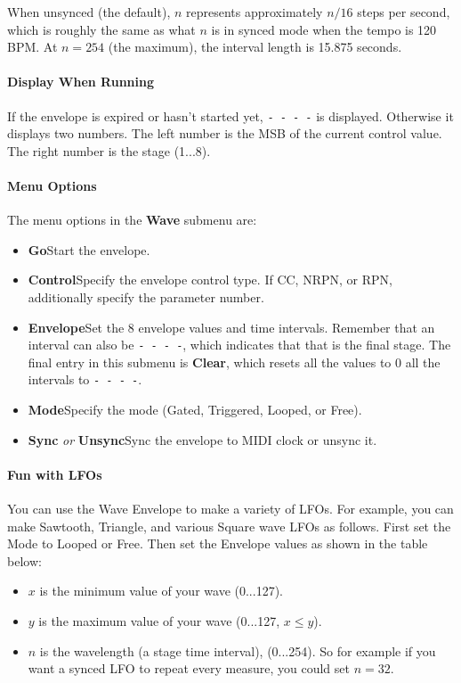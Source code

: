 \documentclass{article}
\begin{document}
When unsynced (the default), \(n\) represents approximately \(n/16\) steps per second, which is roughly the same as what \(n\) is in synced mode when the tempo is 120 BPM.    At \(n=254\) (the maximum), the interval length is 15.875 seconds.

\paragraph{Display When Running}  If the envelope is expired or hasn't started yet,  \texttt{-~-~-~-} is displayed.  Otherwise it displays two numbers.  The left number is the MSB of the current control value.  The right number is the stage (1...8).

\paragraph{Menu Options}  The menu options in the {\bf Wave} submenu are:

\begin{itemize}
\item {\bf Go}\quad Start the envelope.
\item {\bf Control}\quad Specify the envelope control type.  If CC, NRPN, or RPN, additionally specify the parameter number. 
\item {\bf Envelope}\quad Set the 8 envelope values and time intervals.  Remember that an interval can also be \texttt{-~-~-~-}, which indicates that that is the final stage.  The final entry in this submenu is {\bf Clear}, which resets all the values to 0 all the intervals to \texttt{-~-~-~-}. 
\item {\bf Mode}\quad Specify the mode (Gated, Triggered, Looped, or Free).
\item {\bf Sync} {\it or} {\bf Unsync}\quad Sync the envelope to MIDI clock or unsync it.
\end{itemize}

\paragraph{Fun with LFOs}  You can use the Wave Envelope to make a variety of LFOs.  For example, you can make Sawtooth, Triangle, and various Square wave LFOs as follows.  First set the Mode to Looped or Free.  Then set the Envelope values as shown in the table below:

\begin{itemize}
\item \(x\) is the minimum value of your wave (0...127).
\item \(y\) is the maximum value of your wave (0...127, \(x \leq y\)).
\item \(n\) is the wavelength (a stage time interval), (0...254).  So for example if you want a synced LFO to repeat every measure, you could set \(n=32\).
\end{itemize} 
\end{document}
